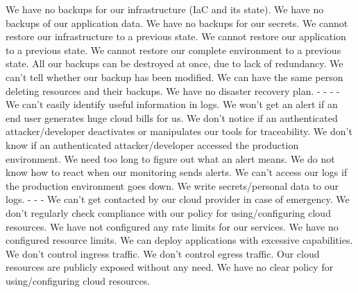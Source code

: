  {We have no backups for our infrastructure (IaC and its state).}
 {We have no backups of our application data.}
 {We have no backups for our secrets.}
 {We cannot restore our infrastructure to a previous state.}
 {We cannot restore our application to a previous state.}
 {We cannot restore our complete environment to a previous state.}
 {All our backups can be destroyed at once, due to lack of redundancy.}
 {We can't tell whether our backup has been modified.}
 {We can have the same person deleting resources and their backups.}
 {We have no disaster recovery plan.}
%
 {-}
 {-}
 {-}
 {-}
 {We can't easily identify useful information in logs.}
 {We won't get an alert if an end user generates huge cloud bills for us.}
 {We don't notice if an authenticated attacker/developer deactivates or manipulates our tools for traceability.}
 {We don't know if an authenticated attacker/developer accessed the production environment.}
 {We need too long to figure out what an alert means.}
 {We do not know how to react when our monitoring sends alerts.}
 {We can't access our logs if the production environment goes down.}
 {We write secrets/personal data to our logs.}
%
 {-}
 {-}
 {-}
 {We can't get contacted by our cloud provider in case of emergency.}
 {We don't regularly check compliance with our policy for using/configuring cloud resources.}
 {We have not configured any rate limits for our services.}
 {We have no configured resource limits.}
 {We can deploy applications with excessive capabilities.}
 {We don't control ingress traffic.}
 {We don't control egress traffic.}
 {Our cloud resources are publicly exposed without any need.}
 {We have no clear policy for using/configuring cloud resources.}
